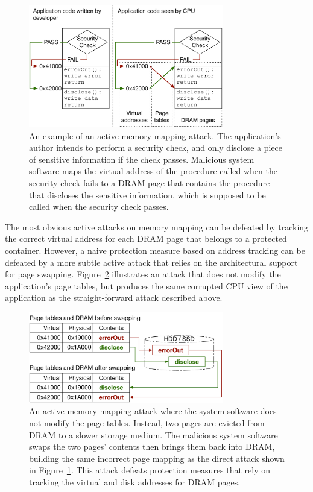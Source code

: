 \begin{figure}[hbt]
  \centering
  \includegraphics[width=85mm]{figures/active_mapping_attack.pdf}
  \caption{
    An example of an active memory mapping attack. The application's author
    intends to perform a security check, and only disclose a piece of sensitive
    information if the check passes. Malicious system software maps the virtual
    address of the procedure called when the security check fails to a DRAM
    page that contains the procedure that discloses the sensitive information,
    which is supposed to be called when the security check passes.
  }
  \label{fig:active_mapping_attack}
\end{figure}


\label{sec:page_swapping_attacks}

The most obvious active attacks on memory mapping can be defeated by tracking
the correct virtual address for each DRAM page that belongs to a protected
container. However, a naive protection measure based on address tracking can be
defeated by a more subtle active attack that relies on the architectural
support for page swapping. Figure~\ref{fig:swap_mapping_attack} illustrates an
attack that does not modify the application's page tables, but produces the
same corrupted CPU view of the application as the straight-forward attack
described above.

\begin{figure}[hbt]
  \centering
  \includegraphics[width=85mm]{figures/swap_mapping_attack.pdf}
  \caption{
    An active memory mapping attack where the system software does not modify
    the page tables. Instead, two pages are evicted from DRAM to a slower
    storage medium. The malicious system software swaps the two pages' contents
    then brings them back into DRAM, building the same incorrect page mapping
    as the direct attack shown in Figure~\ref{fig:active_mapping_attack}. This
    attack defeats protection measures that rely on tracking the virtual and
    disk addresses for DRAM pages.
  }
  \label{fig:swap_mapping_attack}
\end{figure}

